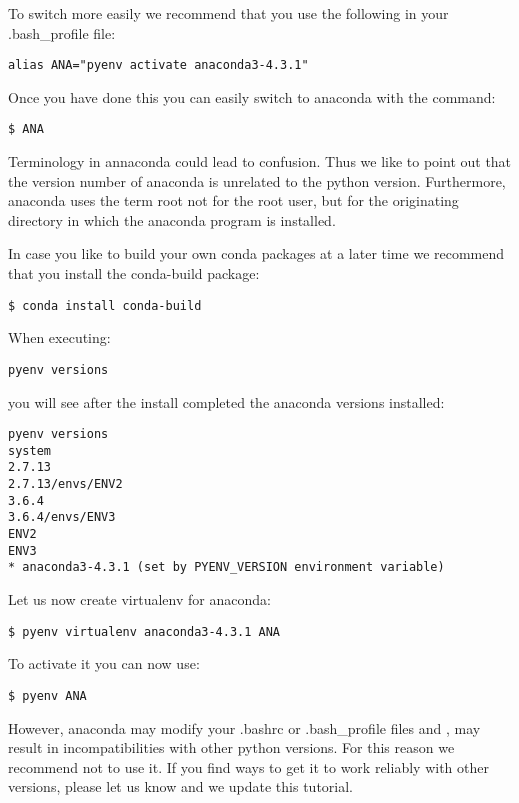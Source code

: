 To switch more easily we recommend that you use the following in your
.bash\_profile file:

\begin{verbatim}
alias ANA="pyenv activate anaconda3-4.3.1"
\end{verbatim}

Once you have done this you can easily switch to anaconda with the
command:

\begin{verbatim}
$ ANA
\end{verbatim}

Terminology in annaconda could lead to confusion. Thus we like to point
out that the version number of anaconda is unrelated to the python
version. Furthermore, anaconda uses the term root not for the root user,
but for the originating directory in which the anaconda program is
installed.

In case you like to build your own conda packages at a later time we
recommend that you install the conda-build package:

\begin{verbatim}
$ conda install conda-build
\end{verbatim}

When executing:

\begin{verbatim}
pyenv versions
\end{verbatim}

you will see after the install completed the anaconda versions
installed:

\begin{verbatim}
pyenv versions
system
2.7.13
2.7.13/envs/ENV2
3.6.4
3.6.4/envs/ENV3
ENV2 
ENV3
* anaconda3-4.3.1 (set by PYENV_VERSION environment variable)
\end{verbatim}

Let us now create virtualenv for anaconda:

\begin{verbatim}
$ pyenv virtualenv anaconda3-4.3.1 ANA
\end{verbatim}

To activate it you can now use:

\begin{verbatim}
$ pyenv ANA
\end{verbatim}

However, anaconda may modify your .bashrc or .bash\_profile files and ,
may result in incompatibilities with other python versions. For this
reason we recommend not to use it. If you find ways to get it to work
reliably with other versions, please let us know and we update this
tutorial.

